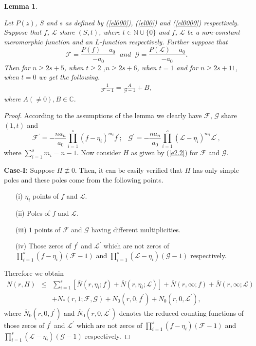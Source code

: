\documentclass[a4paper,draft]{amsproc}
\theoremstyle{plain}
\newtheorem{lem}{Lemma}[section]
\theoremstyle{definition}
\theoremstyle{remark}
\newcommand{\ol}{\overline}
\newcommand{\be}{\begin{equation}}
\newcommand{\ee}{\end{equation}}
\newcommand{\beas}{\begin{eqnarray*}}
\newcommand{\eeas}{\end{eqnarray*}}
\newcommand{\bea}{\begin{eqnarray}}
\newcommand{\eea}{\end{eqnarray}}
\renewcommand{\d}{\displaystyle}
\numberwithin{equation}{section}
\renewcommand{\leq}{\leqslant}\renewcommand{\geq}{\geqslant}
\begin{document}
\begin{lem}\label{l11}

Let $P(z)$, $S$ and $s$ as defined by (\ref{el000}), (\ref{el00}) and (\ref{el0000}) respectively. Suppose that $f$, $\mathcal{L}$ share $(S,t)$, where  $t\in \mathbb{N}\cup\{0\}$ and $f$, $\mathcal{L}$ be a non-constant meromorphic function and an $L$-function respectively. Further suppose that  \be\label{el04}\mathcal{F}=\d\frac{P(f)-a_{0}}{-a_{0}}\;\; and\;\; \mathcal{G}=\d\frac{P(\mathcal{L})-a_{0}}{-a_{0}}.\ee Then for $n\geq 2s+5$, when $t\geq 2$ ,$n\geq 2s+6$, when $t=1$ and for $n\geq2s+11$, when $t=0$ we get the following.
\beas\frac{1}{\mathcal{F}-1}=\frac{A}{\mathcal{G}-1}+B,\eeas where $A(\neq0), B\in\mathbb{C}$.
\end{lem}
\begin{proof}
According to the assumptions of the lemma we clearly have  $\mathcal{F}$, $\mathcal{G}$ share $(1,t)$ and $$\mathcal{F}^{'}=-\frac{na_{n}}{a_{0}}\prod\limits_{i=1}^{s}(f-\eta_{i})^{m_{i}}f^{'};\;\;\; \mathcal{G}^{'}=-\frac{na_{n}}{a_{0}}\prod\limits_{i=1}^{s}(\mathcal{L}-\eta_{i})^{m_{i}}\mathcal{L}^{'},$$ where $\sum\limits_{i=1}^{s}m_{i}=n-1$. 
Now consider $H$ as given by (\ref{e2.2}) for $\mathcal{F}$ and $\mathcal{G}$.
\vspace{0.1in}\par{\bf Case-I:} Suppose $H\not\equiv 0$. Then, it can be easily verified that $H$ has only simple poles and these poles come  from  the following points.
\begin{enumerate}
\item[(i)] $\eta_{i}$ points of $f$ and $\mathcal{L}$.
\item[(ii)] Poles of $f$ and $\mathcal{L}$.
\item[(iii)] $1$ points of $\mathcal{F}$ and $\mathcal{G}$ having different multiplicities.
\item[(iv)] Those zeros of $f^{'}$ and $\mathcal{L}^{'}$ which are not zeros of   $\prod\limits_{i=1}^{s}(f-\eta_{i})(\mathcal{F}-1)$ and $\prod\limits_{i=1}^{s}(\mathcal{L}-\eta_{i})(\mathcal{G}-1)$ respectively.
\end{enumerate}
Therefore we obtain 
\bea\label{e2.1} N(r,H)&\leq& \sum\limits_{i=1}^{s}\left[\ol N(r,\eta_{i};f)+\ol N(r,\eta_{i};\mathcal{L})\right]+\ol N(r,\infty;f)+\ol N(r,\infty;\mathcal{L})\\\nonumber&&+\ol N_{*}(r,1;\mathcal{F},\mathcal{G})+\ol N_{0}(r,0,f^{'})+\ol N_{0}(r,0,\mathcal{L}^{'}),\eea where $\ol N_{0}(r,0,f^{'})$ and $\ol N_{0}(r,0,\mathcal{L}^{'})$ denotes the reduced counting functions of those zeros of $f^{'}$ and $\mathcal{L^{'}}$ which are not zeros of   $\prod\limits_{i=1}^{s}(f-\eta_{i})(\mathcal{F}-1)$ and $\prod\limits_{i=1}^{s}(\mathcal{L}-\eta_{i})(\mathcal{G}-1)$ respectively.

\end{proof}
\end{document}

